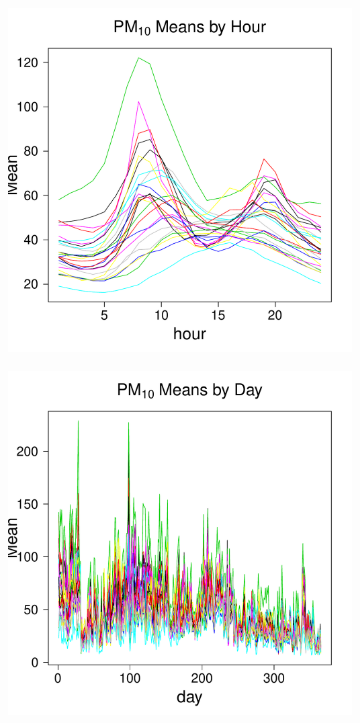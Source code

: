 \documentclass[alpha-refs]{wiley-article}
\begin{document}
\begin{figure}[H]
  \begin{center}
    \begin{subfigure}[b]{.3\textwidth}
      \includegraphics[width=\textwidth]{hour_mean_PM10}
            \label{fig:hour_mean_pm10}
         \end{subfigure}
                    \begin{subfigure}[b]{.3\textwidth}
      \includegraphics[width=\textwidth]{day_mean_PM10.pdf}

\end{subfigure}
\end{center}
\end{figure}
\end{document}
